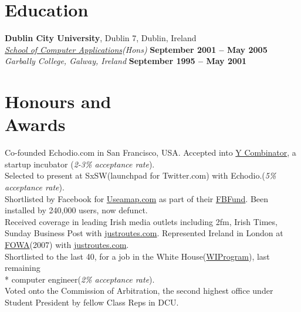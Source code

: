 \documentclass[margin,line]{resume}
\begin{document}
\begin{resume}
    \section{\mysidestyle Education}
    \textbf{Dublin City University}, Dublin 7, Dublin, Ireland \vspace{2mm}\\\vspace{1mm}%
    \textsl{\href{http://www.computing.dcu.ie}{School of Computer Applications}(Hons)} \hfill \textbf{ September 2001 -- May 2005}\\
    \textsl{Garbally College, Galway, Ireland} \hfill \textbf{September 1995 -- May 2001}\vspace{-3mm}\\\vspace{-1mm}%


    \section{\mysidestyle Honours and\\Awards} 

    Co-founded Echodio.com in San Francisco, USA. Accepted into \href{http://ycombinator.com/}{Y Combinator}, a startup incubator (\emph{2-3\% acceptance rate}).\vspace{1mm}\\%
    Selected to present at SxSW(launchpad for Twitter.com) with Echodio.(\emph{5\% acceptance rate}).\vspace{1mm}\\%
    Shortlisted by Facebook for \href{http://useamap.}{Useamap.com} as part of their \href{http://fbfund.com/about/}{FBFund}. Been installed by 240,000 users, now defunct.\vspace{1mm}\\%
    Received coverage in leading Irish media outlets including 2fm, Irish Times, Sunday Business Post with \href{http://justroutes.com}{justroutes.com}. Represented Ireland in London at \href{http://futureofwebapps.com/}{FOWA}(2007) with \href{http://justroutes.com}{justroutes.com}.\vspace{1mm}\\%
    Shortlisted to the last 40, for a job in the White House(\href{http://wiprogram.org/WIP}{WIProgram}), last remaining \\* computer engineer(\emph{2\% acceptance rate}).\vspace{1mm}\\%
    Voted onto the Commission of Arbitration, the second highest office under Student President by fellow Class Reps in DCU.\vspace{1mm}\\%


\end{resume}
\end{document}
